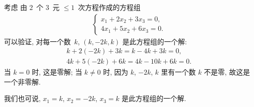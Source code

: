 \begin{example}
    考虑%
    由 \(2\)~个 \(3\)~元 \({\leq} 1\)~次方程作成的方程组
    \begin{align*}
        \begin{cases}
            x_1 + 2x_2 + 3x_3 = 0, \\
            4x_1 + 5x_2 + 6x_3 = 0.
        \end{cases}
    \end{align*}
    可以验证, 对每一个数~\(k\),
    \((k, -2k, k)\) 是此方程组的一个解:
    \begin{align*}
        k + 2(-2k) + 3k = k - 4k + 3k = 0, \\
        4k + 5(-2k) + 6k = 4k - 10k + 6k = 0.
    \end{align*}
    当 \(k = 0\) 时, 这是零解;
    当 \(k \neq 0\) 时, 因为
    \(k\), \(-2k\), \(k\) 里有一个数 \(k\) 不是零,
    故这是一个非零解.

    我们也可说,
    \(x_1 = k\),
    \(x_2 = -2k\),
    \(x_3 = k\)
    是此方程组的一个解.
\end{example}


